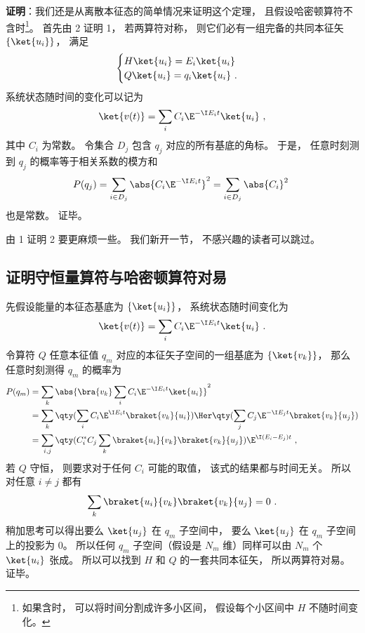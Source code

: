 \textbf{证明}：我们还是从离散本征态的简单情况来证明这个定理， 且假设哈密顿算符不含时\footnote{如果含时， 可以将时间分割成许多小区间， 假设每个小区间中 $H$ 不随时间变化。}。 首先由 2 证明 1， 若两算符对称， 则它们必有一组完备的共同本征矢 $\{\ket{u_i}\}$， 满足
\begin{equation}
\begin{cases}
H \ket{u_i} = E_i \ket{u_i}\\
Q \ket{u_i} = q_i \ket{u_i}~.
\end{cases}
\end{equation}
系统状态随时间的变化可以记为
\begin{equation}
\ket{v(t)} = \sum_i C_i \E^{-\I E_i t} \ket{u_i}~,
\end{equation}
其中 $C_i$ 为常数。 令集合 $D_j$ 包含 $q_j$ 对应的所有基底的角标。 于是， 任意时刻测到 $q_j$ 的概率等于相关系数的模方和
\begin{equation}
P(q_j) = \sum_{i \in D_j} \abs{C_i \E^{-\I E_i t}}^2 = \sum_{i \in D_j} \abs{C_i}^2~
\end{equation}
也是常数。 证毕。

由 1 证明 2 要更麻烦一些。 我们新开一节， 不感兴趣的读者可以跳过。

\subsection{证明守恒量算符与哈密顿算符对易}
先假设能量的本征态基底为 $\{\ket{u_i}\}$， 系统状态随时间变化为
\begin{equation}
\ket{v(t)} = \sum_i C_i \E^{-\I E_i t} \ket{u_i}~.
\end{equation}
令算符 $Q$ 任意本征值 $q_m$ 对应的本征矢子空间的一组基底为 $\{\ket{v_k}\}$， 那么任意时刻测得 $q_m$ 的概率为
\begin{equation}
\begin{aligned}
P(q_m) &= \sum_k \abs{\bra{v_k} \sum_i C_i \E^{-\I E_i t} \ket{u_i}}^2\\
&= \sum_k \qty(\sum_i C_i \E^{\I E_i t} \braket{v_k}{u_i})\Her \qty(\sum_j C_j \E^{-\I E_j t} \braket{v_k}{u_j})\\
&= \sum_{i,j} \qty( C_i^* C_j \sum_k \braket{u_i}{v_k} \braket{v_k}{u_j}) \E^{\I (E_i - E_j) t}~,
\end{aligned}
\end{equation}
若 $Q$ 守恒， 则要求对于任何 $C_i$ 可能的取值， 该式的结果都与时间无关。 所以对任意 $i \ne j$ 都有
\begin{equation}
\sum_k \braket{u_i}{v_k} \braket{v_k}{u_j} = 0~.
\end{equation}
稍加思考可以得出要么 $\ket{u_j}$ 在 $q_m$ 子空间中， 要么 $\ket{u_j}$ 在 $q_m$ 子空间上的投影为 0。 所以任何 $q_m$ 子空间（假设是 $N_m$ 维）同样可以由 $N_m$ 个 $\ket{u_i}$ 张成。 所以可以找到 $H$ 和 $Q$ 的一套共同本征矢， 所以两算符对易。 证毕。
